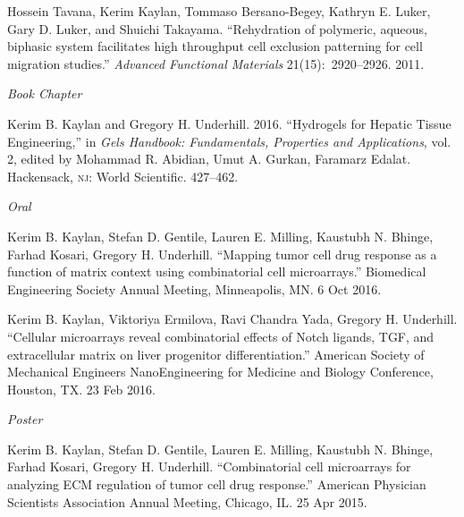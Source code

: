 \documentclass[11pt,article,oneside]{memoir}
\begin{document}
\ind Hossein Tavana, Kerim Kaylan, Tommaso Bersano-Begey, Kathryn E. Luker, Gary D. Luker, and Shuichi Takayama. ``Rehydration of polymeric, aqueous, biphasic system facilitates high throughput cell exclusion patterning for cell migration studies.'' \emph{Advanced Functional Materials} 21(15):~2920--2926. 2011.


\bigskip

\noindent\textit{Book Chapter \vspace{0.05in}}

\ind Kerim B. Kaylan and Gregory H. Underhill. 2016. ``Hydrogels for Hepatic Tissue Engineering,'' in \emph{Gels Handbook: Fundamentals, Properties and Applications}, vol. 2, edited by Mohammad R. Abidian, Umut A. Gurkan, Faramarz Edalat. Hackensack, \textsc{nj}: World Scientific. 427--462.


\bigskip 


\noindent\textit{Oral \vspace{0.05in}}

\ind Kerim B. Kaylan, Stefan D. Gentile, Lauren E. Milling, Kaustubh N. Bhinge, Farhad Kosari, Gregory H. Underhill. ``Mapping tumor cell drug response as a function of matrix context using combinatorial cell microarrays.'' Biomedical Engineering Society Annual Meeting, Minneapolis, MN. 6 Oct 2016.

\ind Kerim B. Kaylan, Viktoriya Ermilova, Ravi Chandra Yada, Gregory H. Underhill. ``Cellular microarrays reveal combinatorial effects of Notch ligands, TGF\textbeta, and extracellular matrix on liver progenitor differentiation.'' American Society of Mechanical Engineers NanoEngineering for Medicine and Biology Conference, Houston, TX. 23 Feb 2016.

\bigskip

\noindent\textit{Poster \vspace{0.05in}}

\ind Kerim B. Kaylan, Stefan D. Gentile, Lauren E. Milling, Kaustubh N. Bhinge, Farhad Kosari, Gregory H. Underhill. ``Combinatorial cell microarrays for analyzing ECM regulation of tumor cell drug response.'' American Physician Scientists Association Annual Meeting, Chicago, IL. 25 Apr 2015.
\end{document}
